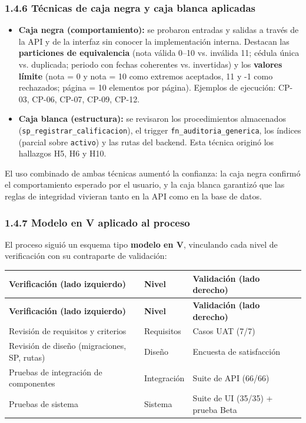 \documentclass[11pt,a4paper]{article}
\begin{document}
\subsubsection*{1.4.6 Técnicas de caja negra y caja blanca aplicadas}


\begin{itemize}[leftmargin=*]
\item \textbf{Caja negra (comportamiento):} se probaron entradas y salidas a través de la API y de la interfaz sin conocer la implementación interna. Destacan las \textbf{particiones de equivalencia} (nota válida 0--10 vs. inválida 11; cédula única vs. duplicada; periodo con fechas coherentes vs. invertidas) y los \textbf{valores límite} (nota = 0 y nota = 10 como extremos aceptados, 11 y -1 como rechazados; página = 10 elementos por página). Ejemplos de ejecución: CP-03, CP-06, CP-07, CP-09, CP-12.
\item \textbf{Caja blanca (estructura):} se revisaron los procedimientos almacenados (\texttt{sp\_registrar\_calificacion}), el trigger \texttt{fn\_auditoria\_generica}, los índices (parcial sobre \texttt{activo}) y las rutas del backend. Esta técnica originó los hallazgos H5, H6 y H10.
\end{itemize}


El uso combinado de ambas técnicas aumentó la confianza: la caja negra confirmó el comportamiento esperado por el usuario, y la caja blanca garantizó que las reglas de integridad vivieran tanto en la API como en la base de datos.


\subsubsection*{1.4.7 Modelo en V aplicado al proceso}


El proceso siguió un esquema tipo \textbf{modelo en V}, vinculando cada nivel de verificación con su contraparte de validación:


{\small
\begin{longtable}{|p{}|p{}|p{}|}
\rowcolor{UTECblue}\color{white}\bfseries Verificación (lado izquierdo) & \color{white}\bfseries Nivel & \color{white}\bfseries Validación (lado derecho) \\ \hline
\endfirsthead
\rowcolor{UTECblue}\color{white}\bfseries Verificación (lado izquierdo) & \color{white}\bfseries Nivel & \color{white}\bfseries Validación (lado derecho) \\ \hline
\endhead
Revisión de requisitos y criterios & Requisitos & Casos UAT (7/7) \\ \hline
Revisión de diseño (migraciones, SP, rutas) & Diseño & Encuesta de satisfacción \\ \hline
Pruebas de integración de componentes & Integración & Suite de API (66/66) \\ \hline
Pruebas de sistema & Sistema & Suite de UI (35/35) + prueba Beta \\ \hline
\end{longtable}}
\end{document}
